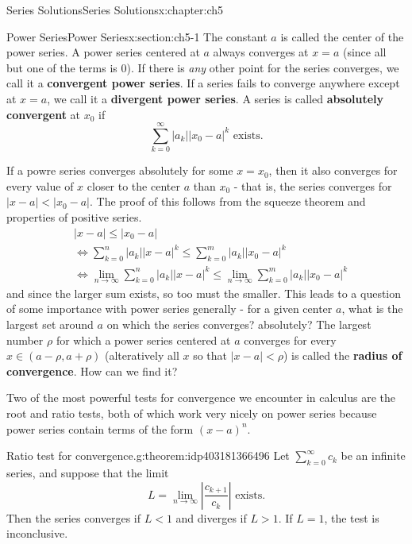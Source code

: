 \documentclass[oneside,10pt,]{book}
\newcommand{\terminology}[1]{\textbf{#1}}
\numberwithin{equation}{section}
\newcommand{\abs}[1]{\left\vert#1\right\vert}
\numberwithin{equation}{section}
\newcommand{\lt}{<}
\newcommand{\amp}{&}
\begin{document}
\begin{chapterptx}{Series Solutions}{}{Series Solutions}{}{}{x:chapter:ch5}
\begin{sectionptx}{Power Series}{}{Power Series}{}{}{x:section:ch5-1}
The constant \(a\) is called the center of the power series. A power series centered at \(a\) always converges at \(x = a\) (since all but one of the terms is \(0\)). If there is \emph{any} other point for the series converges, we call it a \terminology{convergent power series}. If a series fails to converge anywhere except at \(x = a\), we call it a \terminology{divergent power series}. A series is called \terminology{absolutely convergent} at \(x_0\) if%
\begin{equation*}
\sum_{k=0}^\infty \abs{a_k} \abs{ x_0-a}^k \text{ exists.}
\end{equation*}
%
\par
If a powre series converges absolutely for some \(x = x_0\), then it also converges for every value of \(x\) closer to the center \(a\) than \(x_0\) - that is, the series converges for \(\abs{x - a} \lt \abs{x_0 - a}\). The proof of this follows from the squeeze theorem and properties of positive series.%
\begin{align*}
\amp \abs{x - a} \leq \abs{x_0 - a}\\
\amp \Leftrightarrow \sum_{k=0}^n \abs{a_k}\abs{x - a}^k \leq \sum_{k=0}^m \abs{a_k}\abs{x_0 - a}^k\\
\amp \Leftrightarrow \lim_{n \to \infty} \sum_{k=0}^n \abs{a_k}\abs{x - a}^k \leq \lim_{n \to \infty} \sum_{k=0}^m \abs{a_k}\abs{x_0 - a}^k
\end{align*}
and since the larger sum exists, so too must the smaller. This leads to a question of some importance with power series generally - for a given center \(a\), what is the largest set around \(a\) on which the series converges? absolutely? The largest number \(\rho\) for which a power series centered at \(a\) converges for every \(x \in (a - \rho, a + \rho)\) (alteratively all \(x\) so that \(\abs{x - a} \lt \rho\)) is called the \terminology{radius of convergence}. How can we find it?%
\par
Two of the most powerful tests for convergence we encounter in calculus are the root and ratio tests, both of which work very nicely on power series because power series contain terms of the form \((x-a)^n\).%
\begin{theorem}{Ratio test for convergence.}{}{g:theorem:idp403181366496}%
Let \(\sum_{k=0}^\infty c_k\) be an infinite series, and suppose that the limit%
\begin{equation*}
L = \lim_{n\to\infty} \abs{\frac{c_{k+1}}{c_k}} \text{ exists.}
\end{equation*}
Then the series converges if \(L \lt 1\) and diverges if \(L > 1\). If \(L = 1\), the test is inconclusive.%

\end{theorem}
\end{sectionptx}
\end{chapterptx}
\end{document}
